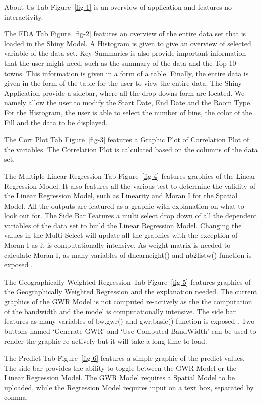 \documentclass[manuscript,screen]{acmart}
\begin{document}
About Us Tab Figure~\ref{fig-1} is an overview of application and
features no interactivity.

The EDA Tab Figure~\ref{fig-2} features an overview of the entire data
set that is loaded in the Shiny Model. A Histogram is given to give an
overview of selected variable of the data set. Key Summaries is also
provide important information that the user might need, such as the
summary of the data and the Top 10 towns. This information is given in a
form of a table. Finally, the entire data is given in the form of the
table for the user to view the entire data. The Shiny Application
provide a sidebar, where all the drop downs form are located. We namely
allow the user to modify the Start Date, End Date and the Room Type. For
the Histogram, the user is able to select the number of bins, the color
of the Fill and the data to be displayed.

The Corr Plot Tab Figure~\ref{fig-3} features a Graphic Plot of
Correlation Plot of the variables. The Correlation Plot is calculated
based on the columns of the data set.

The Multiple Linear Regression Tab Figure~\ref{fig-4} features graphics
of the Linear Regression Model. It also features all the various test to
determine the validity of the Linear Regression Model, such as Linearity
and Moran I for the Spatial Model. All the outputs are featured as a
graphic with explanation on what to look out for. The Side Bar Features
a multi select drop down of all the dependent variables of the data set
to build the Linear Regression Model. Changing the values in the Multi
Select will update all the graphics with the exception of Moran I as it
is computationally intensive. As weight matrix is needed to calculate
Moran I, as many variables of dnearneight() and nb2listw() function is
exposed \citep{spdep}.

The Geographically Weighted Regression Tab Figure~\ref{fig-5} features
graphics of the Geographically Weighted Regression and the explanation
needed. The current graphics of the GWR Model is not computed
re-actively as the the computation of the bandwidth and the model is
computationally intensive. The side bar features as many variables of
bw.gwr() and gwr.basic() function is exposed \citep{GWmodel}. Two
buttons named `Generate GWR' and `Use Computed BandWidth' can be used to
render the graphic re-actively but it will take a long time to load.

The Predict Tab Figure~\ref{fig-6} features a simple graphic of the
predict values. The side bar provides the ability to toggle between the
GWR Model or the Linear Regression Model. The GWR Model requires a
Spatial Model to be uploaded, while the Regression Model requires input
on a text box, separated by comma.
\end{document}
